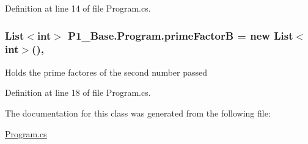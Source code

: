 Definition at line 14 of file Program.\-cs.

\hypertarget{class_p1___base_1_1_program_ab76652179b4151a50e1fadf328abdb44}{
\subsubsection[{prime\-Factor\-B}]{\setlength{\rightskip}{0pt plus 5cm}List$<$int$>$ P1\-\_\-\-Base.\-Program.\-prime\-Factor\-B = new List$<$int$>$()\hspace{0.3cm}{\ttfamily [static]}, {\ttfamily [private]}}}\label{class_p1___base_1_1_program_ab76652179b4151a50e1fadf328abdb44}
Holds the prime factores of the second number passed 

Definition at line 18 of file Program.\-cs.



The documentation for this class was generated from the following file\-:\begin{DoxyCompactItemize}
\item 
\hyperlink{_program_8cs}{Program.\-cs}\end{DoxyCompactItemize}
